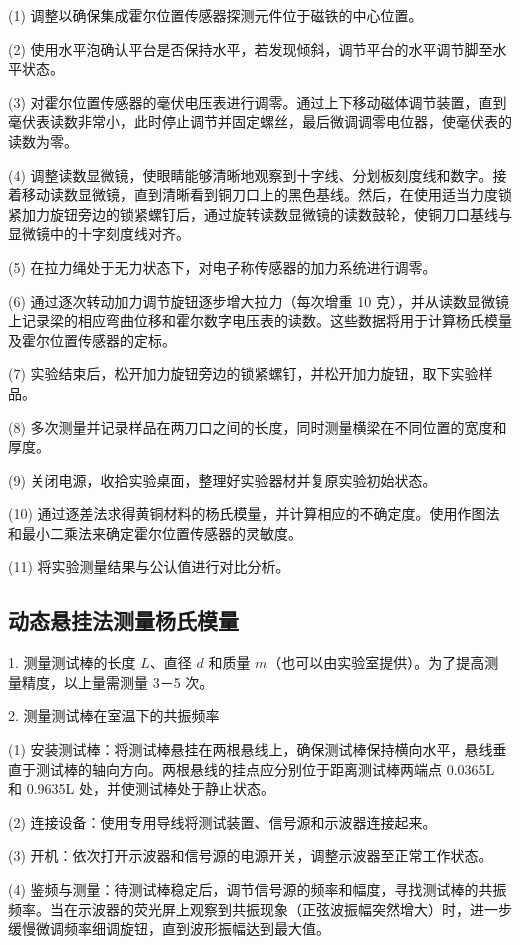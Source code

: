 \documentclass[UTF-8,twoside,cs4size]{ctexart}
\begin{document}
(1) 调整以确保集成霍尔位置传感器探测元件位于磁铁的中心位置。

(2) 使用水平泡确认平台是否保持水平，若发现倾斜，调节平台的水平调节脚至水平状态。

(3) 对霍尔位置传感器的毫伏电压表进行调零。通过上下移动磁体调节装置，直到毫伏表读数非常小，此时停止调节并固定螺丝，最后微调调零电位器，使毫伏表的读数为零。

(4) 调整读数显微镜，使眼睛能够清晰地观察到十字线、分划板刻度线和数字。接着移动读数显微镜，直到清晰看到铜刀口上的黑色基线。然后，在使用适当力度锁紧加力旋钮旁边的锁紧螺钉后，通过旋转读数显微镜的读数鼓轮，使铜刀口基线与显微镜中的十字刻度线对齐。

(5) 在拉力绳处于无力状态下，对电子称传感器的加力系统进行调零。

(6) 通过逐次转动加力调节旋钮逐步增大拉力（每次增重 10 克），并从读数显微镜上记录梁的相应弯曲位移和霍尔数字电压表的读数。这些数据将用于计算杨氏模量及霍尔位置传感器的定标。

(7) 实验结束后，松开加力旋钮旁边的锁紧螺钉，并松开加力旋钮，取下实验样品。

(8) 多次测量并记录样品在两刀口之间的长度，同时测量横梁在不同位置的宽度和厚度。

(9) 关闭电源，收拾实验桌面，整理好实验器材并复原实验初始状态。

(10) 通过逐差法求得黄铜材料的杨氏模量，并计算相应的不确定度。使用作图法和最小二乘法来确定霍尔位置传感器的灵敏度。

(11) 将实验测量结果与公认值进行对比分析。

\subsection{动态悬挂法测量杨氏模量}
1. 测量测试棒的长度 $L$、直径 $d$ 和质量 $m$（也可以由实验室提供）。为了提高测量精度，以上量需测量 3－5 次。

2. 测量测试棒在室温下的共振频率

(1) 安装测试棒：将测试棒悬挂在两根悬线上，确保测试棒保持横向水平，悬线垂直于测试棒的轴向方向。两根悬线的挂点应分别位于距离测试棒两端点 0.0365L 和 0.9635L 处，并使测试棒处于静止状态。

(2) 连接设备：使用专用导线将测试装置、信号源和示波器连接起来。

(3) 开机：依次打开示波器和信号源的电源开关，调整示波器至正常工作状态。

(4) 鉴频与测量：待测试棒稳定后，调节信号源的频率和幅度，寻找测试棒的共振频率。当在示波器的荧光屏上观察到共振现象（正弦波振幅突然增大）时，进一步缓慢微调频率细调旋钮，直到波形振幅达到最大值。
\end{document}
